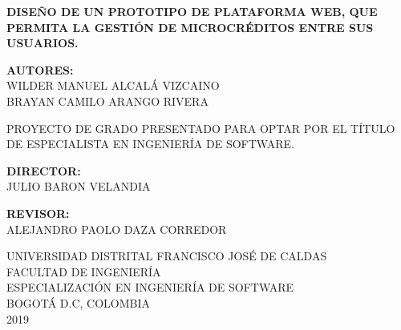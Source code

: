 \begin{titlepage}
	\begin{center}
	\textbf{DISEÑO DE UN PROTOTIPO DE PLATAFORMA WEB, QUE PERMITA LA GESTIÓN DE MICROCRÉDITOS ENTRE SUS USUARIOS.}\\
	\vspace{2.5cm}
	
	\textbf{AUTORES:}\\
	{WILDER MANUEL ALCALÁ VIZCAINO}\\
	{BRAYAN CAMILO ARANGO RIVERA}\\ 
	\vspace{2.5cm}
	
	{PROYECTO DE GRADO PRESENTADO PARA OPTAR POR EL TÍTULO DE ESPECIALISTA EN INGENIERÍA DE SOFTWARE.}\\
	\vspace{2.5cm}
	
	\textbf{DIRECTOR:}\\
	{JULIO BARON VELANDIA}\\
	\vspace{1cm}
	
	\textbf{REVISOR:}\\
	{ALEJANDRO PAOLO DAZA CORREDOR}\\
	\vspace{2cm}
	

	
	
	{UNIVERSIDAD DISTRITAL FRANCISCO JOSÉ DE CALDAS}\\
	{FACULTAD DE INGENIERÍA}\\
	{ESPECIALIZACIÓN EN INGENIERÍA DE SOFTWARE}\\
	{BOGOTÁ D.C, COLOMBIA}\\
	{2019}\\
	\end{center}
\end{titlepage}